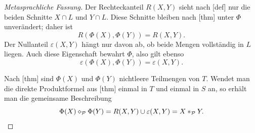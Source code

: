 \documentclass[main.tex]{subfiles}
\begin{document}
\begin{proof}[Metasprachliche Fassung]
\leavevmode\par
Der Rechteckanteil \(R(X,Y)\) sieht nach
[def] nur die beiden Schnitte
\(X\cap L\) und \(Y\cap L\). Diese Schnitte bleiben nach
[thm] unter \(\Phi\)
unverändert; daher ist
\[
  R(\Phi(X),\Phi(Y))=R(X,Y).
\]
Der Nullanteil
\(\varepsilon(X,Y)\) hängt nur davon ab, ob beide Mengen vollständig in
\(L\) liegen. Auch diese Eigenschaft bewahrt \(\Phi\), also gilt ebenso
\[
  \varepsilon(\Phi(X),\Phi(Y))=\varepsilon(X,Y).
\]

Nach [thm] sind
\(\Phi(X)\) und \(\Phi(Y)\) nichtleere Teilmengen von \(T\). Wendet man
die direkte Produktformel aus
[thm] einmal
in \(T\) und einmal in \(S\) an, so erhält man die gemeinsame Beschreibung
\[
  \Phi(X)\mathbin{\diamond}_{\mathcal P}\Phi(Y)
  =R(X,Y)\cup\varepsilon(X,Y)
  =X\mathbin{\ast}_{\mathcal P}Y.
\]
\end{proof}
\end{document}
